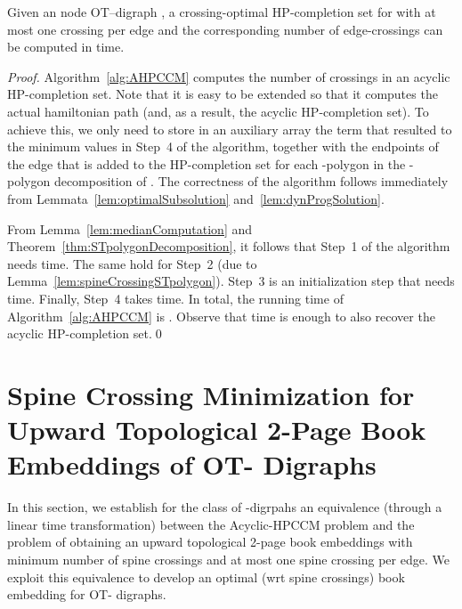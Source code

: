 \documentclass{myllncs-mixalis}
\newcommand{\eat}[1] {{}}
\begin{document}
\begin{theorem}
\label{thm:optimalAcyclicHPCCM} Given an   node OT--digraph
, a  crossing-optimal HP-completion set for  with at most one
crossing per edge and the corresponding number of edge-crossings can
be computed in  time.
\end{theorem}

\begin{proof}
Algorithm~\ref{alg:AHPCCM} computes the number of crossings in an
acyclic HP-completion set. Note that it is easy to be extended so
that it computes the actual hamiltonian path (and, as a result, the
acyclic HP-completion set). To achieve this, we only need to store
in an auxiliary array the term that resulted to the minimum values
in Step~4 of the algorithm, together with the endpoints of the edge
that is added to the HP-completion set for each -polygon in the
-polygon decomposition  of . The correctness of the algorithm follows
immediately from Lemmata~\ref{lem:optimalSubsolution}
and~\ref{lem:dynProgSolution}.

From Lemma~\ref{lem:medianComputation} and
Theorem~\ref{thm:STpolygonDecomposition}, it follows that Step~1 of
the algorithm needs  time. The same hold for Step~2 (due to
Lemma~\ref{lem:spineCrossingSTpolygon}). Step~3 is an initialization
step that needs  time. Finally, Step~4 takes 
time. In total, the running time of  Algorithm~\ref{alg:AHPCCM} is
. Observe that  time is enough to also recover the
acyclic HP-completion set.\qed
\end{proof}


\section{Spine Crossing Minimization for Upward Topological 2-Page Book Embeddings of OT-
Digraphs}

In this section,  we establish for the class of -digrpahs an
equivalence (through a linear time transformation) between the
Acyclic-HPCCM problem and the problem of obtaining an upward
topological 2-page book embeddings with minimum number of spine
crossings and at most one spine crossing per edge. We exploit this
equivalence to develop an optimal (wrt spine crossings) book
embedding for  OT- digraphs.

\eat{
\begin{lemma} An optimal upward topological  2-page book embedding of a rhombus
has exactly one spine crossing.
\end{lemma}
\begin{proof}
Note that a rhombus does not have a hamiltonian path and that it has
an optimal HP-completion set consisting of a single edge. Then, the
lemma, follows as a consequence of
Theorem~\ref{thm:BEequivHPcompletionSet}. \qed
\end{proof}
}
\end{document}
